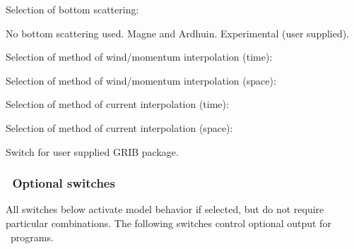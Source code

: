 \noindent
Selection of bottom scattering:
\begin{slist}
 {No bottom scattering used.}
 {Magne and Ardhuin.}
 {Experimental (user supplied).}
\end{slist}

\noindent
Selection of method of wind/momentum interpolation (time):
\begin{slist}
\end{slist}

\noindent
Selection of method of wind/momentum interpolation (space):
\begin{slist}
\end{slist}

\noindent
Selection of method of current interpolation (time):
\begin{slist}
\end{slist}

\noindent
Selection of method of current interpolation (space):
\begin{slist}
\end{slist}

\noindent
Switch for user supplied GRIB package.
\begin{slist}
\end{slist}

\vsssub
\subsubsection{~Optional switches} \label{sub:opt_switch}
\vsssub

All switches below activate model behavior if selected, but do not require
particular combinations. The following switches control optional output for
\ws\ programs.

